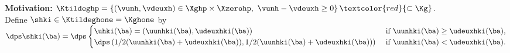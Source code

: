 \documentclass{beamer}
\begin{document}
\begin{frame}
\begin{figure}[H]
\begin{subfigure}[normal]{0.32\textwidth}
\label{ref:lambda_membrane_inside_iter} 
\end{subfigure}
\end{figure}
\vspace{-0.2 cm}
\textcolor{cadmiumgreen}{\textbf{Motivation:}}   $\Ktildeghp = \left\{(\vunh,\vdeuxh) \in \Xghp \times \Xzerohp, \ \vunh-\vdeuxh \geq 0  \right\} \textcolor{red}{\subset \Kg}$.\\ Define $\shki \in \Ktildeghone= \Kghone$ by
\vspace{0.2 cm}
$\dps \shki (\ba)= \dps \begin{cases}
\uhki(\ba) = \left(\uunhki(\ba), \udeuxhki(\ba)\right) \ &\mbox{if $\uunhki(\ba) \geq \udeuxhki(\ba)$,}\\
\dps  \left(1/2 (\uunhki(\ba) + \udeuxhki(\ba)), 1/2 (\uunhki(\ba) + \udeuxhki(\ba))\right) \ &\mbox{if $\uunhki(\ba) < \udeuxhki(\ba)$.}\end{cases}$
\end{frame}
\end{document}
